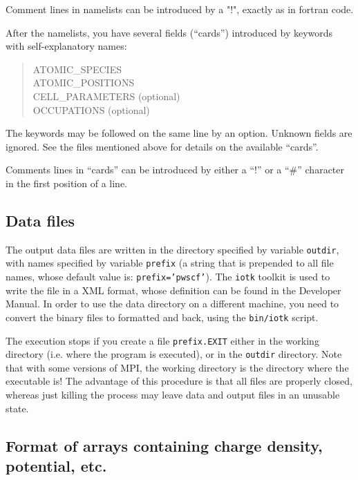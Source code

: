 \documentclass[12pt,a4paper]{article}
\begin{document}
Comment lines in namelists can be introduced by a "!", exactly as in 
fortran code. 

After the namelists, you have several fields (``cards'')
introduced by keywords with self-explanatory names:
\begin{quote}
       ATOMIC\_SPECIES\\
       ATOMIC\_POSITIONS\\
       CELL\_PARAMETERS (optional)\\
       OCCUPATIONS (optional)\\
\end{quote}
The keywords may be followed on the same line by an option. Unknown
fields are ignored. 
See the files mentioned above for details on the available ``cards''.

Comments lines in ``cards'' can be introduced by either a ``!'' or a ``\#''
character in the first position of a line.
 
\subsection{Data files}

The output data files are written in the directory specified by variable
\texttt{outdir}, with names specified by variable \texttt{prefix} (a string that is prepended
to all file names, whose default value is: \texttt{prefix='pwscf'}). The \texttt{iotk}
toolkit is used to write the file in a XML format, whose definition can
be found in the Developer Manual. In order to use the data directory
on a different machine, you need to convert the binary files to formatted
and back, using the \texttt{bin/iotk} script.

The execution stops if you create a file \texttt{prefix.EXIT} either 
in the working directory (i.e. where the program is executed), or in 
the  \texttt{outdir} directory. Note that with some versions of MPI, 
the working directory  is the directory where the executable is! 
The advantage of this procedure is that all files are properly closed, 
whereas  just killing the process may leave data and output files in 
an unusable state.

\subsection{Format of arrays containing charge density, potential, etc.}
\end{document}
